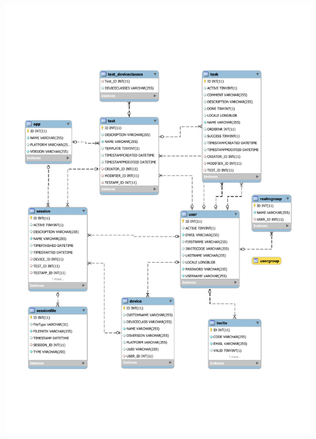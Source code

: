 \begin{minipage}[t]{\textwidth}
	\centering
	\includegraphics[width=\linewidth]{img/datenbankschema}
	\label{fig:datenmankschema}
\end{minipage}

